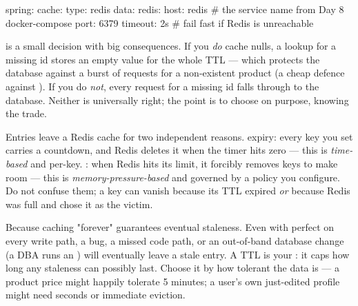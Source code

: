 \begin{yamlbox}
spring:
  cache:
    type: redis
  data:
    redis:
      host: redis        # the service name from Day 8 docker-compose
      port: 6379
      timeout: 2s        # fail fast if Redis is unreachable
\end{yamlbox}

\begin{dbinsight}
 is a small decision with big consequences. If you \emph{do} cache nulls, a lookup for a missing id stores an empty value for the whole TTL --- which protects the database against a burst of requests for a non-existent product (a cheap defence against ). If you do \emph{not}, every request for a missing id falls through to the database. Neither is universally right; the point is to choose on purpose, knowing the trade.
\end{dbinsight}


 Entries leave a Redis cache for two independent reasons.  expiry: every key you set carries a countdown, and Redis deletes it when the timer hits zero --- this is \emph{time-based} and per-key. : when Redis hits its  limit, it forcibly removes keys to make room --- this is \emph{memory-pressure-based} and governed by a policy you configure. Do not confuse them; a key can vanish because its TTL expired \emph{or} because Redis was full and chose it as the victim.

 Because caching "forever" guarantees eventual staleness. Even with perfect  on every write path, a bug, a missed code path, or an out-of-band database change (a DBA runs an ) will eventually leave a stale entry. A TTL is your : it caps how long any staleness can possibly last. Choose it by how tolerant the data is --- a product price might happily tolerate 5 minutes; a user's own just-edited profile might need seconds or immediate eviction.

